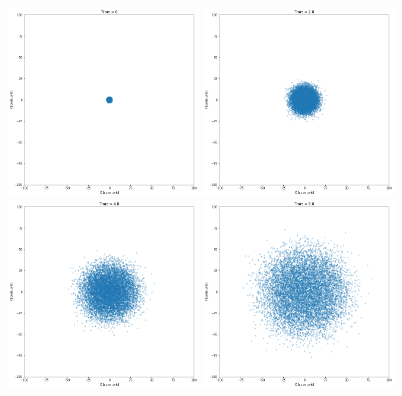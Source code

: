 \documentclass[12pt]{article}
\begin{document}
  \begin{figure}[H]
    \centering 
    \includegraphics[width = 0.45\textwidth]{./LF/0.png} 
    \includegraphics[width = 0.45\textwidth]{./LF/2.png} 
    \includegraphics[width = 0.45\textwidth]{./LF/4.png} 
    \includegraphics[width = 0.45\textwidth]{./LF/6.png} 

\end{figure}
\end{document}

